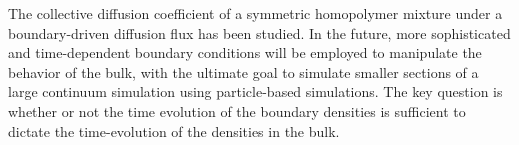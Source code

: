 \documentclass[bachelor,       %
               twoside,        %
               BCOR10mm,       %
                ngerman,english  %
               ]{GAUBM}
\begin{document}
The collective diffusion coefficient of a symmetric homopolymer mixture under a boundary-driven diffusion flux has been studied. In the future, more sophisticated and time-dependent boundary conditions will be employed to manipulate the behavior of the bulk, with the ultimate goal to simulate smaller sections of a large continuum simulation using particle-based simulations. The key question is whether or not the time evolution of the boundary densities is sufficient to dictate the time-evolution of the densities in the bulk.




 


\end{document}
